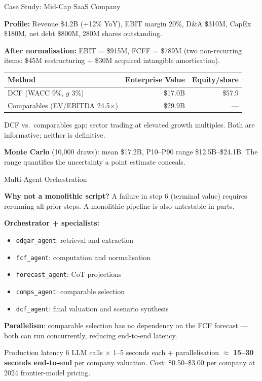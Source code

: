 \documentclass[9pt,t]{beamer}
\begin{document}
\begin{frame}[noframenumbering]{Case Study: Mid-Cap SaaS Company}

\textbf{Profile:} Revenue \$4.2B (+12\% YoY), EBIT margin 20\%, D\&A \$310M,
CapEx \$180M, net debt \$800M, 280M shares outstanding.

\medskip
\textbf{After normalisation:} EBIT = \$915M, FCFF = \$789M
(two non-recurring items: \$45M restructuring + \$30M acquired intangible amortisation).

\medskip
\begin{center}
\begin{tabular}{lrr}
\toprule
\textbf{Method} & \textbf{Enterprise Value} & \textbf{Equity/share} \\
\midrule
DCF (WACC 9\%, $g$ 3\%) & \$17.0B & \$57.9 \\
Comparables (EV/EBITDA 24.5$\times$) & \$29.9B & --- \\
\bottomrule
\end{tabular}
\end{center}

\medskip
DCF vs.\ comparables gap: sector trading at elevated growth multiples.
Both are informative; neither is definitive.

\medskip
\textbf{Monte Carlo} (10{,}000 draws): mean \$17.2B, P10--P90 range \$12.5B--\$24.1B.
The range quantifies the uncertainty a point estimate conceals.
\end{frame}

\begin{frame}[noframenumbering]{Multi-Agent Orchestration}

\textbf{Why not a monolithic script?}
A failure in step 6 (terminal value) requires rerunning all prior steps.
A monolithic pipeline is also untestable in parts.

\medskip
\textbf{Orchestrator + specialists:}
\begin{itemize}
  \item \texttt{edgar\_agent}: retrieval and extraction
  \item \texttt{fcf\_agent}: computation and normalisation
  \item \texttt{forecast\_agent}: CoT projections
  \item \texttt{comps\_agent}: comparable selection
  \item \texttt{dcf\_agent}: final valuation and scenario synthesis
\end{itemize}

\medskip
\textbf{Parallelism}: comparable selection has no dependency on the FCF forecast ---
both can run concurrently, reducing end-to-end latency.

\medskip
\begin{block}{Production latency}
6 LLM calls $\times$ 1--5 seconds each + parallelisation $\approx$
\textbf{15--30 seconds end-to-end} per company valuation.
Cost: \$0.50--\$3.00 per company at 2024 frontier-model pricing.
\end{block}
\end{frame}
\end{document}

